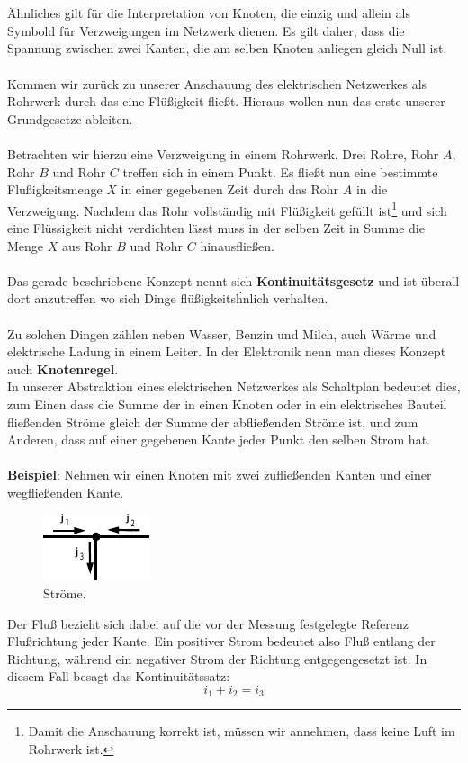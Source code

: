 \documentclass[11pt,a4paper,leqno]{report}
\numberwithin{equation}{chapter}
\begin{document}
\\
\\
\"Ahnliches gilt f\"ur die Interpretation von Knoten, die einzig und allein als Symbold f\"ur Verzweigungen im Netzwerk dienen. Es gilt daher, dass die Spannung zwischen zwei Kanten, die am selben Knoten anliegen gleich Null ist.\\
\\
Kommen wir zur\"uck zu unserer Anschauung des elektrischen Netzwerkes als Rohrwerk durch das eine Fl\"u\ss{}igkeit flie\ss{}t. Hieraus wollen nun das erste unserer Grundgesetze ableiten.
\\
\\
Betrachten wir hierzu eine Verzweigung in einem Rohrwerk. Drei Rohre, Rohr $A$, Rohr $B$ und Rohr $C$ treffen sich in einem Punkt. Es flie\ss{}t nun eine bestimmte Flu\ss{}igkeitsmenge $X$ in einer gegebenen Zeit durch das Rohr $A$ in die Verzweigung. Nachdem das Rohr vollst\"andig mit Fl\"u\ss{}igkeit gef\"ullt ist\footnote{Damit die Anschauung korrekt ist, m\"ussen wir annehmen, dass keine Luft im Rohrwerk ist.} und sich eine Fl\"ussigkeit nicht verdichten l\"asst muss in der selben Zeit in Summe die Menge $X$ aus Rohr $B$ und Rohr $C$ hinausflie\ss{}en.\\
\\
Das gerade beschriebene Konzept nennt sich \textbf{Kontinuit\"atsgesetz} und ist \"uberall dort anzutreffen wo sich Dinge fl\"u\ss{}igkeits\"hnlich verhalten.\\
\\
Zu solchen Dingen z\"ahlen neben Wasser, Benzin und Milch, auch W\"arme und elektrische Ladung in einem Leiter. In der Elektronik nenn man dieses Konzept auch \textbf{Knotenregel}.\\
In unserer Abstraktion eines elektrischen Netzwerkes als Schaltplan bedeutet dies, zum Einen dass die Summe der in einen Knoten oder in ein elektrisches Bauteil flie\ss{}enden Str\"ome gleich der Summe der abflie\ss{}enden Str\"ome ist, und zum Anderen, dass auf einer gegebenen Kante jeder Punkt den selben Strom hat.\\
\\
\textbf{Beispiel}: Nehmen wir einen Knoten mit zwei zuflie\ss{}enden Kanten und einer wegflie\ss{}enden Kante.
\begin{figure}[H]
	\begin{center}
		\includegraphics[scale=2]{Bilder/flow.pdf}
		\caption{Str\"ome.}
	\end{center}
\end{figure}
\noindent
Der Flu\ss{} bezieht sich dabei auf die vor der Messung festgelegte Referenz Flu\ss{}richtung jeder Kante. Ein positiver Strom bedeutet also Flu\ss{} entlang der Richtung, w\"ahrend ein negativer Strom der Richtung entgegengesetzt ist. In diesem Fall besagt das Kontinuit\"atssatz:
\begin{equation}
i_1 + i_2 = i_3
\end{equation}
\end{document}
